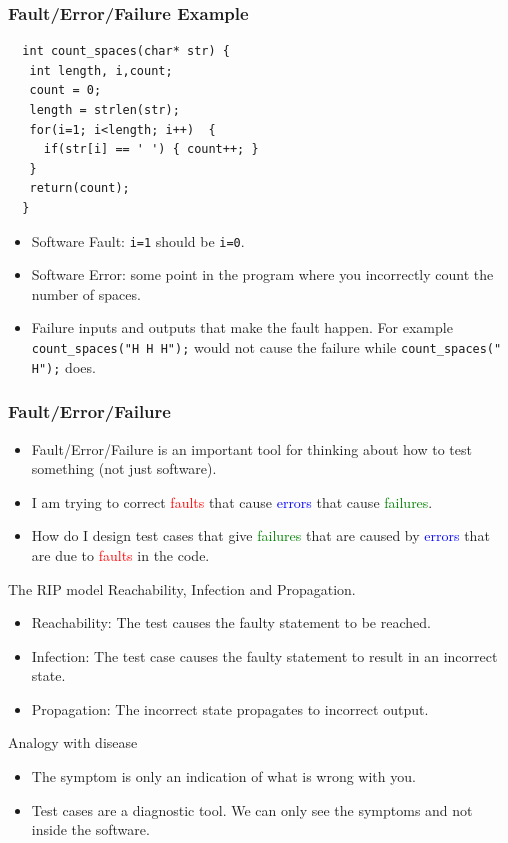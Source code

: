 \documentclass{beamer}
\begin{document}
\begin{frame}[fragile]
  \frametitle{Fault/Error/Failure Example}
\begin{lstlisting}
  int count_spaces(char* str) {
   int length, i,count;
   count = 0;
   length = strlen(str);
   for(i=1; i<length; i++)  { 
     if(str[i] == ' ') { count++; }
   }
   return(count);
  }
\end{lstlisting}
  \begin{itemize}
  \item Software Fault: {\tt i=1} should be {\tt i=0}.
  \item Software Error: some point in the program where you
    incorrectly count the number of spaces.
  \item Failure  inputs and outputs that make the fault happen. For
    example {\tt count\_spaces("H H H");} would not cause the failure
    while {\tt count\_spaces(" H");} does.
  \end{itemize}
\end{frame}
\begin{frame}
  \frametitle{Fault/Error/Failure}
  \begin{itemize}
  \item Fault/Error/Failure is an important tool for thinking about how to
    test something (not just software).
  \item I am trying to correct \textcolor{red}{faults} that cause
    \textcolor{blue}{errors} that cause \textcolor{green}{failures}.
  \item How do I design test cases that give  \textcolor{green}{failures} that
    are caused by  \textcolor{blue}{errors} that are due to
    \textcolor{red}{faults} in the code.
  \end{itemize}
\end{frame}

\begin{frame}{The RIP model}
 Reachability,  Infection and Propagation.
  \begin{itemize}
  \item Reachability: The test causes the faulty statement to be
    reached.
  \item Infection: The test case causes the faulty statement to result
    in an incorrect state.
  \item Propagation: The incorrect state propagates to incorrect output.
    \end{itemize}
  \end{frame}
  \begin{frame}{Analogy with disease}
    \begin{itemize}
    \item The symptom is only an indication of what is wrong with you.
    \item Test cases are a diagnostic tool. We can only see the
      symptoms and not inside the software. 
    \end{itemize}    
  \end{frame}
\end{document}

